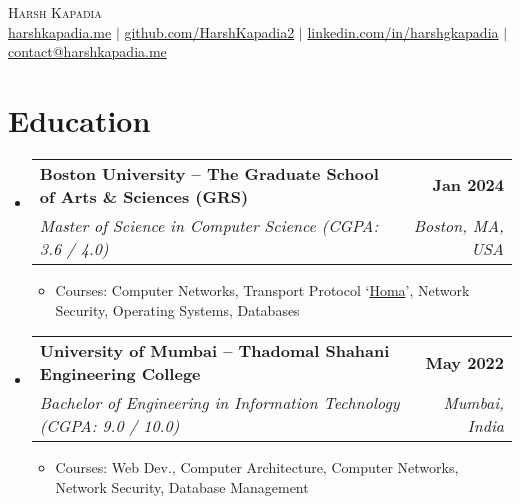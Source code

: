 \documentclass[letterpaper,11pt]{article}
\makeatletter
\newcommand{\resumeItem}[1]{
  \item\small{
    {#1 \vspace{-2pt}}
  }
}
\newcommand{\resumeSubheading}[4]{
  \vspace{-2pt}\item
    \begin{tabular*}{1.0\textwidth}[t]{l@{\extracolsep{\fill}}r}
      \vspace{-2pt}\textbf{#1} & \textbf{\small #2} \\
      \textit{\small#3} & \textit{\small #4} \\
    \end{tabular*}\vspace{-7pt}
}
\newcommand{\resumeSubHeadingListStart}{\begin{itemize}[leftmargin=0.0in, label={}]}
\newcommand{\resumeSubHeadingListEnd}{\end{itemize}}
\newcommand{\resumeItemListStart}{\begin{itemize}}
\newcommand{\resumeItemListEnd}{\end{itemize}\vspace{-5pt}}
\makeatother
\begin{document}

\begin{center}
    {\huge \scshape Harsh Kapadia} \\ \vspace{5pt}
    \small
    \href{https://harshkapadia.me}{harshkapadia.me} $|$ \href{https://github.com/HarshKapadia2}{github.com/HarshKapadia2} $|$ \href{https://linkedin.com/in/harshgkapadia}{linkedin.com/in/harshgkapadia} $|$ \href{mailto:contact@harshkapadia.me}{contact@harshkapadia.me}
    \vspace{-8pt}
\end{center}


\section{Education}
    \resumeSubHeadingListStart
        \resumeSubheading
            {Boston University -- The Graduate School of Arts \& Sciences (GRS)}{Jan 2024}
            {Master of Science in Computer Science (CGPA: 3.6 / 4.0)}{Boston, MA, USA}
            \resumeItemListStart
                \resumeItem{Courses: Computer Networks, Transport Protocol `\href{https://networking.harshkapadia.me/files/homa/report}{Homa}', Network Security, Operating Systems, Databases}
            \resumeItemListEnd

        \resumeSubheading
            {University of Mumbai -- Thadomal Shahani Engineering College}{May 2022}
            {Bachelor of Engineering in Information Technology (CGPA: 9.0 / 10.0)}{Mumbai, India}
            \resumeItemListStart
                \resumeItem{Courses: Web Dev., Computer Architecture, Computer Networks, Network Security, Database Management}
            \resumeItemListEnd
    \resumeSubHeadingListEnd
\vspace{-15pt}


\end{document}
